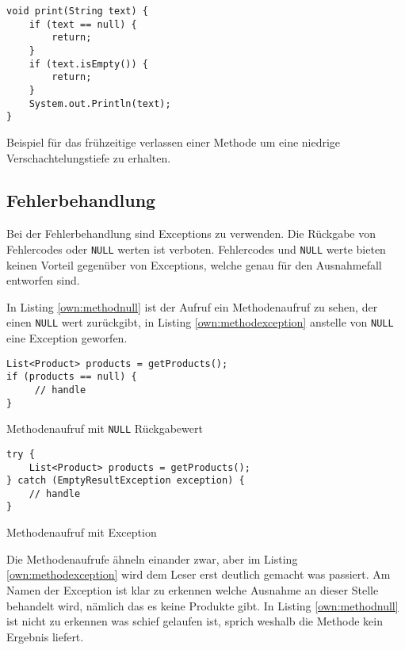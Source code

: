 \begin{listing}[H]
    \begin{verbatim}
void print(String text) {
    if (text == null) {
        return;
    }
    if (text.isEmpty()) {
        return;
    }
    System.out.Println(text);
}
    \end{verbatim}
    \caption{Beispiel für das frühzeitige verlassen einer Methode um eine niedrige Verschachtelungstiefe zu erhalten.}
    \label{own:lowindent}
\end{listing}

\subsection{Fehlerbehandlung}
Bei der Fehlerbehandlung sind Exceptions zu verwenden. Die Rückgabe von Fehlercodes oder \texttt{NULL} werten ist verboten. Fehlercodes und \texttt{NULL} werte bieten keinen Vorteil gegenüber von Exceptions, welche genau für den Ausnahmefall entworfen sind. 

In Listing \ref{own:methodnull} ist der Aufruf ein Methodenaufruf zu sehen, der einen \texttt{NULL} wert zurückgibt, in Listing \ref{own:methodexception} anstelle von \texttt{NULL} eine Exception geworfen.

\begin{listing}[H]
    \begin{verbatim}
List<Product> products = getProducts();
if (products == null) {
     // handle
}
    \end{verbatim}
    \caption{Methodenaufruf mit \texttt{NULL} Rückgabewert}
    \label{own:methodnull}
\end{listing}

\begin{listing}[H]
    \begin{verbatim}
try {
    List<Product> products = getProducts();
} catch (EmptyResultException exception) {
    // handle
}
    \end{verbatim}
    \caption{Methodenaufruf mit Exception}
    \label{own:methodexception}
\end{listing}

Die Methodenaufrufe ähneln einander zwar, aber im Listing \ref{own:methodexception} wird dem Leser erst deutlich gemacht was passiert. Am Namen der Exception ist klar zu erkennen welche Ausnahme an dieser Stelle behandelt wird, nämlich das es keine Produkte gibt. In Listing \ref{own:methodnull} ist nicht zu erkennen was schief gelaufen ist, sprich weshalb die Methode kein Ergebnis liefert.

